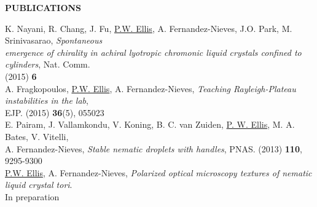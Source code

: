 \documentclass[10pt]{article}
\newenvironment{changemargin}[2]{%
  \list{}{\rightmargin#2\leftmargin#1
    \parsep=0pt\topsep=1pt\partopsep=0pt}
\item[]} {\endlist}
\newenvironment{indentmore}{\begin{changemargin}{10pt}{0cm}}{\end{changemargin}}
\begin{document}
\textbf{\large PUBLICATIONS} 
\begin{indentmore}
K. Nayani, R. Chang, J. Fu, \underline{P.W. Ellis}, A. Fernandez-Nieves, J.O. Park, M. Srinivasarao, \emph{Spontaneous \\ \hspace*{15pt} emergence of chirality in achiral lyotropic chromonic liquid crystals confined to cylinders}, Nat. Comm. \\ \hspace*{15pt}  (2015) {\bf 6} \\

A. Fragkopoulos, \underline{P.W. Ellis}, A. Fernandez-Nieves, \emph{Teaching Rayleigh-Plateau instabilities in the lab}, \\ \hspace*{15pt}EJP. (2015) {\bf 36}(5), 055023 \\

E. Pairam, J. Vallamkondu, V. Koning, B. C. van Zuiden, \underline{P. W. Ellis}, M. A. Bates, V. Vitelli, \\ \hspace*{15pt}A. Fernandez-Nieves, \emph{Stable nematic droplets with handles}, PNAS. (2013) {\bf 110}, 9295-9300\\

\underline{P.W. Ellis}, A. Fernandez-Nieves, \emph{Polarized optical microscopy textures of nematic liquid crystal tori}. \\ \hspace*{15pt}In preparation\\
\end{indentmore}
\end{document}
